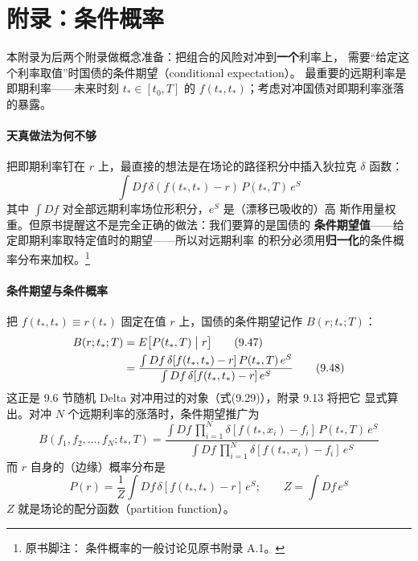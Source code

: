 \section{附录：条件概率}

本附录为后两个附录做概念准备：把组合的风险对冲到\textbf{一个}利率上，
需要“给定这个利率取值”时国债的条件期望（conditional expectation）。
最重要的远期利率是即期利率——未来时刻 $t_*\in[t_0,T]$ 的
$f(t_*,t_*)$；考虑对冲国债对即期利率涨落的暴露。

\paragraph{天真做法为何不够}
把即期利率钉在 $r$ 上，最直接的想法是在场论的路径积分中插入狄拉克
$\delta$ 函数：
\begin{equation*}
\int Df\,\delta(f(t_*,t_*)-r)\,P(t_*,T)\,e^{S}\tag{9.46}
\end{equation*}
其中 $\int Df$ 对全部远期利率场位形积分，$e^{S}$ 是（漂移已吸收的）高
斯作用量权重。但原书提醒这不是完全正确的做法：我们要算的是国债的
\textbf{条件期望值}——给定即期利率取特定值时的期望——所以对远期利率
的积分必须用\textbf{归一化}的条件概率分布来加权。\footnote{原书脚注：
条件概率的一般讨论见原书附录 A.1。}

\paragraph{条件期望与条件概率}
把 $f(t_*,t_*)\equiv r(t_*)$ 固定在值 $r$ 上，国债的条件期望记作
$B(r;t_*;T)$：
\begin{align*}
B(r;t_*;T)&=E\bigl[P(t_*,T)\bigm|r\bigr]\tag{9.47}\\
&=\frac{\int Df\,\delta[f(t_*,t_*)-r]\,P(t_*,T)\,e^{S}}
{\int Df\,\delta[f(t_*,t_*)-r]\,e^{S}}\tag{9.48}
\end{align*}
这正是 9.6 节随机 Delta 对冲用过的对象（式(9.29)），附录 9.13 将把它
显式算出。对冲 $N$ 个远期利率的涨落时，条件期望推广为
\begin{equation*}
B(f_1,f_2,\ldots,f_N;t_*,T)=
\frac{\int Df\,\prod_{i=1}^{N}\delta[f(t_*,x_i)-f_i]\,P(t_*,T)\,e^{S}}
{\int Df\,\prod_{i=1}^{N}\delta[f(t_*,x_i)-f_i]\,e^{S}}\tag{9.49}
\end{equation*}
而 $r$ 自身的（边缘）概率分布是
\begin{equation*}
P(r)=\frac{1}{Z}\int Df\,\delta[f(t_*,t_*)-r]\,e^{S};\qquad
Z=\int Df\,e^{S}\tag{9.50}
\end{equation*}
$Z$ 就是场论的配分函数（partition function）。

